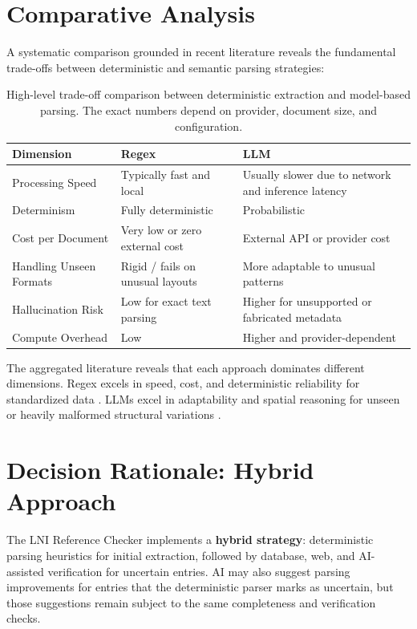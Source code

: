\documentclass[12pt,a4paper,oneside]{report}
\begin{document}
\section{Comparative Analysis}

A systematic comparison grounded in recent literature reveals the fundamental trade-offs between deterministic and semantic parsing strategies:

\begin{table}[H]
\centering
\begin{tabular}{
    >{\raggedright\arraybackslash}p{} 
    >{\raggedright\arraybackslash}p{} 
    >{\raggedright\arraybackslash}p{}
}
\toprule
\textbf{Dimension} & \textbf{Regex} & \textbf{LLM} \\
\midrule
Processing Speed & Typically fast and local & Usually slower due to network and inference latency \\
Determinism & Fully deterministic & Probabilistic \\
Cost per Document & Very low or zero external cost & External API or provider cost \\
Handling Unseen Formats & Rigid / fails on unusual layouts & More adaptable to unusual patterns \\
Hallucination Risk & Low for exact text parsing & Higher for unsupported or fabricated metadata \\
Compute Overhead & Low & Higher and provider-dependent \\
\bottomrule
\end{tabular}
\caption{High-level trade-off comparison between deterministic extraction and model-based parsing. The exact numbers depend on provider, document size, and configuration.}
\label{tab:regex_vs_llm}
\end{table}

The aggregated literature reveals that each approach dominates different dimensions. Regex excels in speed, cost, and deterministic reliability for standardized data \cite{chen2025}. LLMs excel in adaptability and spatial reasoning for unseen or heavily malformed structural variations \cite{bhoi2026, parseur2026}.

\section{Decision Rationale: Hybrid Approach}

The LNI Reference Checker implements a \textbf{hybrid strategy}: deterministic parsing heuristics for initial extraction, followed by database, web, and AI-assisted verification for uncertain entries. AI may also suggest parsing improvements for entries that the deterministic parser marks as uncertain, but those suggestions remain subject to the same completeness and verification checks.
\end{document}
